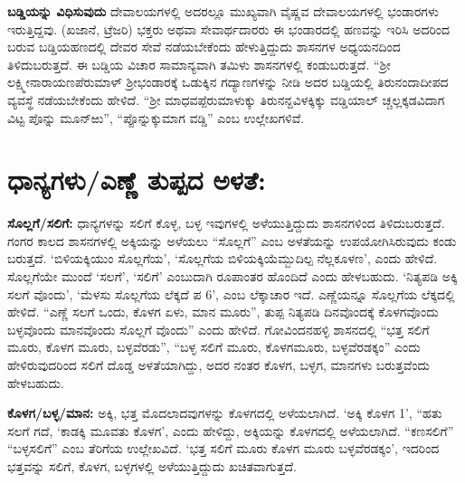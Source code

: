 \textbf{ಬಡ್ಡಿಯನ್ನು ವಿಧಿಸುವುದು} ದೇವಾಲಯಗಳಲ್ಲಿ ಅದರಲ್ಲೂ ಮುಖ್ಯವಾಗಿ ವೈಷ್ಣವ ದೇವಾಲಯಗಳಲ್ಲಿ ಭಂಡಾರಗಳು ಇರುತ್ತಿದ್ದವು. (ಖಜಾನೆ, ಟ್ರೆಜರಿ) ಭಕ್ತರು ಅಥವಾ ಸೇವಾರ್ಥದಾರರು ಈ ಭಂಡಾರದಲ್ಲಿ ಹಣವನ್ನು ಇರಿಸಿ ಅದರಿಂದ ಬರುವ ಬಡ್ಡಿಯಹಣದಲ್ಲಿ ದೇವರ ಸೇವೆ ನಡೆಯಬೇಕೆಂದು ಹೇಳುತ್ತಿದ್ದುದು ಶಾಸನಗಳ ಅಧ್ಯಯನದಿಂದ ತಿಳಿದುಬರುತ್ತದೆ. ಈ ಬಡ್ಡಿಯ ವಿಚಾರ ಸಾಮಾನ್ಯವಾಗಿ ತಮಿಳು ಶಾಸನಗಳಲ್ಲಿ ಕಂಡುಬರುತ್ತದೆ. “ಶ‍್ರೀ ಲಕ್ಷ್ಮೀನಾರಾಯಣಪೆರುಮಾಳ್​ ಶ‍್ರೀಭಂಡಾರಕ್ಕೆ ಒಡುಕ್ಕಿನ ಗದ್ಯಾಣಗಳನ್ನು ನೀಡಿ ಅದರ ಬಡ್ಡಿಯಲ್ಲಿ ತಿರುನಂದಾದೀಪದ ವ್ಯವಸ್ಥೆ ನಡೆಯಬೇಕೆಂದು ಹೇಳಿದೆ. “ಶ‍್ರೀ ಮಾಧವಪ್ಪೆರುಮಾಳುಕ್ಕು ತಿರುನನ್ದವಿಳಕ್ಕಿಕ್ಕು ವಡ್ಡಿಯಾಲ್​ ಚ್ಚಲ್ಲಕ್ಕಡವಿದಾಗ ವಿಟ್ಟ ಪೊನ್ನು ಮೂನ್​ಱು”, “ಪ್ಪೊನ್ನುಕ್ಕುಮಾಗ ವಡ್ಡಿ” ಎಂಬ ಉಲ್ಲೇಖಗಳಿವೆ.


\section{ಧಾನ್ಯಗಳು/ಎಣ್ಣೆ ತುಪ್ಪದ ಅಳತೆ:}

\textbf{ಸೊಲ್ಲಗೆ/ಸಲಿಗೆ:} ಧಾನ್ಯಗಳನ್ನು ಸಲಿಗೆ ಕೊಳ್ಳ, ಬಳ್ಳ ಇವುಗಳಲ್ಲಿ ಅಳೆಯುತ್ತಿದ್ದುದು ಶಾಸನಗಳಿಂದ ತಿಳಿದುಬರುತ್ತದೆ. ಗಂಗರ ಕಾಲದ ಶಾಸನಗಳಲ್ಲಿ ಅಕ್ಕಿಯನ್ನು ಅಳೆಯಲು “ಸೊಲ್ಲಗೆ” ಎಂಬ ಅಳತೆಯನ್ನು ಉಪಯೋಗಿಸಿರುವುದು ಕಂಡು ಬರುತ್ತದೆ. ‘ಬಿಳಿಯಕ್ಕಿಯುಂ ಸೊಲ್ಲಗೆಯ’, ‘ಸೊಲ್ಲಗೆಯ ಬಿಳಿಯಕ್ಕಿಯೆಮ್ಬುದಿಲ್ಪ ನೆಲ್ಲಕೂಳಣ’, ಎಂದು ಹೇಳಿದೆ. ಸೊಲ್ಲಗೆಯೇ ಮುಂದೆ ‘ಸಲಗೆ’, ‘ಸಲಿಗೆ’ ಎಂಬುದಾಗಿ ರೂಪಾಂತರ ಹೊಂದಿದೆ ಎಂದು ಹೇಳಬಹುದು. ‘ನಿತ್ಯಪಡಿ ಅಕ್ಕಿ ಸಲಗೆ ವೊಂದು’, ‘ಮೆಳಸು ಸೊಲ್ಲಗೆಯ ಲೆಕ್ಕದೆ ಪ 6’, ಎಂಬ ಲೆಕ್ಕಾಚಾರ ಇದೆ. ಎಣ್ಣೆಯನ್ನೂ ಸೊಲ್ಲಗೆಯ ಲೆಕ್ಕದಲ್ಲಿ ಹೇಳಿದೆ. “ಎಣ್ಣೆ ಸಲಗೆ ಒಂದು, ಕೊಳಗ ಏಳು, ಮಾನ ಮೂರು”, ತುಪ್ಪ ನಿತ್ಯಪಡಿ ದಿನವೊಂದಕ್ಕೆ ಕೊಳಗವೊಂದು ಬಳ್ಳವೊಂದು ಮಾನವೊಂದು ಸೊಲ್ಲಗೆ ವೊಂದು” ಎಂದು ಹೇಳಿದೆ. ಗೋವಿಂದನಹಳ್ಳಿ ಶಾಸನದಲ್ಲಿ “ಭತ್ತ ಸಲಿಗೆ ಮೂರು, ಕೊಳಗ ಮೂರು, ಬಳ್ಳವೆರಡು”, “ಬಳ್ಳ ಸಲಿಗೆ ಮೂರು, ಕೊಳಗಮೂರು, ಬಳ್ಳವೆರಡಕ್ಕಂ” ಎಂದು ಹೇಳಿರುವುದರಿಂದ ಸಲಿಗೆ ದೊಡ್ಡ ಅಳತೆಯಾಗಿದ್ದು, ಅದರ ನಂತರ ಕೊಳಗ, ಬಳ್ಳಗ, ಮಾನಗಳು ಬರುತ್ತವೆಂದು ಹೇಳಬಹುದು.

\textbf{ಕೊಳಗ/ಬಳ್ಳ/ಮಾನ: } ಅಕ್ಕಿ, ಭತ್ತ ಮೊದಲಾದವುಗಳನ್ನು ಕೊಳಗದಲ್ಲಿ ಅಳೆಯಲಾಗಿದೆ. ‘ಅಕ್ಕಿ ಕೊಳಗ 1’, “ಹತು ಸಲಗೆ ಗದೆ, ‘ಕಾಡಕ್ಕಿ ಮೂವತು ಕೊಳಗ’, ಎಂದು ಹೇಳಿದ್ದು, ಅಕ್ಕಿಯನ್ನು ಕೊಳಗದಲ್ಲಿ ಅಳೆಯಲಾಗಿದೆ. “ಕಣಸಲಿಗೆ” “ಬಳ್ಳಸಲಿಗೆ” ಎಂಬ ತೆರಿಗೆಯ ಉಲ್ಲೇಖವಿದೆ. ‘ಭತ್ತ ಸಲಿಗೆ ಮೂರು ಕೊಳಗ ಮೂರು ಬಳ್ಳವೆರಡಕ್ಕಂ’, ಇದರಿಂದ ಭತ್ತವನ್ನು ಸಲಿಗೆ, ಕೊಳಗ, ಬಳ್ಳಗಳಲ್ಲಿ ಅಳೆಯುತ್ತಿದ್ದುದು ಖಚಿತವಾಗುತ್ತದೆ. 

